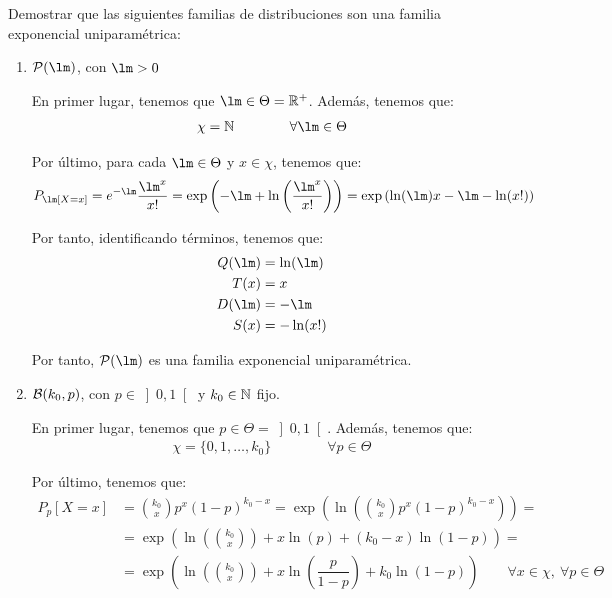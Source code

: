 \begin{ejemplo}
    Demostrar que las siguientes familias de distribuciones son una familia exponencial uniparamétrica:
    \begin{enumerate}
        \item $\cc{P}(\lm)$, con $\lm > 0$
        
        En primer lugar, tenemos que $\lm\in \Theta = \bb{R}^+$. Además, tenemos que:
        \begin{align*}
            \chi = \bb{N} \qquad \qquad \forall \lm\in\Theta
        \end{align*}

        Por último, para cada $\lm\in\Theta$ y $x\in\chi$, tenemos que:
        \begin{align*}
            P_\lm[X=x] = e^{-\lm}\dfrac{\lm^x}{x!}
            = \exp\left(-\lm + \ln\left(\dfrac{\lm^x}{x!}\right)\right)
            = \exp\left(\ln(\lm)x - \lm - \ln(x!)\right)
        \end{align*}

        Por tanto, identificando términos, tenemos que:
        \begin{align*}
            Q(\lm) &= \ln(\lm) \\
            T(x) &= x \\
            D(\lm) &=- \lm \\
            S(x) &=- \ln(x!)
        \end{align*}

        Por tanto, $\cc{P}(\lm)$ es una familia exponencial uniparamétrica.
        \item $\mathcal{B}(k_0, p)$, con $p\in\left]0, 1\right[$ y $k_0\in\mathbb{N}$ fijo.
        
        En primer lugar, tenemos que $p\in \Theta = \left]0, 1\right[$. Además, tenemos que:
        \begin{align*}
            \chi = \{0, 1, \ldots, k_0\}\qquad \qquad \forall p\in\Theta
        \end{align*}

        Por último, tenemos que:
        \begin{align*}
            P_p[X=x] &= \binom{k_0}{x} p^x (1-p)^{k_0-x}
            = \exp\left(\ln\left(\binom{k_0}{x} p^x (1-p)^{k_0-x}\right)\right)
            =\\&= \exp\left(\ln\left(\binom{k_0}{x}\right) + x\ln(p) + (k_0-x)\ln(1-p)\right)
            =\\&= \exp\left(\ln\left(\binom{k_0}{x}\right) + x\ln\left(\dfrac{p}{1-p}\right) + k_0\ln(1-p)\right)
            \qquad \forall x\in\chi,\ \forall p\in\Theta
        \end{align*}


\end{enumerate}
\end{ejemplo}
